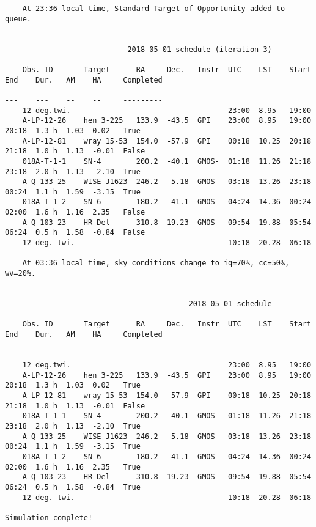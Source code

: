 \documentclass{article}
\begin{document}
\begin{lstlisting}
	At 23:36 local time, Standard Target of Opportunity added to queue.
	
	
	                     -- 2018-05-01 schedule (iteration 3) --
	
	Obs. ID       Target      RA     Dec.   Instr  UTC    LST    Start  End    Dur.   AM    HA     Completed 
	-------       ------      --     ---    -----  ---    ---    -----  ---    ---    --    --     --------- 
	12 deg.twi.                                    23:00  8.95   19:00                                       
	A-LP-12-26    hen 3-225   133.9  -43.5  GPI    23:00  8.95   19:00  20:18  1.3 h  1.03  0.02   True      
	A-LP-12-81    wray 15-53  154.0  -57.9  GPI    00:18  10.25  20:18  21:18  1.0 h  1.13  -0.01  False     
	018A-T-1-1    SN-4        200.2  -40.1  GMOS-  01:18  11.26  21:18  23:18  2.0 h  1.13  -2.10  True      
	A-Q-133-25    WISE J1623  246.2  -5.18  GMOS-  03:18  13.26  23:18  00:24  1.1 h  1.59  -3.15  True      
	018A-T-1-2    SN-6        180.2  -41.1  GMOS-  04:24  14.36  00:24  02:00  1.6 h  1.16  2.35   False     
	A-Q-103-23    HR Del      310.8  19.23  GMOS-  09:54  19.88  05:54  06:24  0.5 h  1.58  -0.84  False     
	12 deg. twi.                                   10:18  20.28  06:18                                       
	
	At 03:36 local time, sky conditions change to iq=70%, cc=50%, wv=20%.
	
	
	                                   -- 2018-05-01 schedule --
	
	Obs. ID       Target      RA     Dec.   Instr  UTC    LST    Start  End    Dur.   AM    HA     Completed 
	-------       ------      --     ---    -----  ---    ---    -----  ---    ---    --    --     --------- 
	12 deg.twi.                                    23:00  8.95   19:00                                       
	A-LP-12-26    hen 3-225   133.9  -43.5  GPI    23:00  8.95   19:00  20:18  1.3 h  1.03  0.02   True      
	A-LP-12-81    wray 15-53  154.0  -57.9  GPI    00:18  10.25  20:18  21:18  1.0 h  1.13  -0.01  False     
	018A-T-1-1    SN-4        200.2  -40.1  GMOS-  01:18  11.26  21:18  23:18  2.0 h  1.13  -2.10  True      
	A-Q-133-25    WISE J1623  246.2  -5.18  GMOS-  03:18  13.26  23:18  00:24  1.1 h  1.59  -3.15  True      
	018A-T-1-2    SN-6        180.2  -41.1  GMOS-  04:24  14.36  00:24  02:00  1.6 h  1.16  2.35   True      
	A-Q-103-23    HR Del      310.8  19.23  GMOS-  09:54  19.88  05:54  06:24  0.5 h  1.58  -0.84  True      
	12 deg. twi.                                   10:18  20.28  06:18                                       

Simulation complete!
\end{lstlisting}
\end{document}
